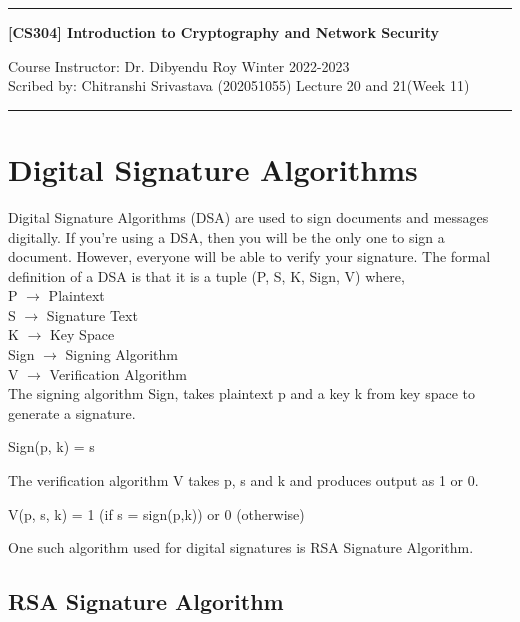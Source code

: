 \documentclass[11pt]{article}
\begin{document}
\noindent
\rule{\textwidth}{1pt}
\begin{center}
{\bf [CS304] Introduction to Cryptography and Network Security}
\end{center}
Course Instructor: Dr. Dibyendu Roy \hfill Winter 2022-2023\\
Scribed by: Chitranshi Srivastava (202051055) \hfill Lecture 20 and 21(Week 11)
\\
\rule{\textwidth}{1pt}

\section{Digital Signature Algorithms}
Digital Signature Algorithms (DSA) are used to sign documents and messages digitally. If you're using a DSA, then you will be the only one to sign a document. However, everyone will be able to verify your signature. The formal definition of a DSA is that it is a tuple (P, S, K, Sign, V) where, \\
    P $\rightarrow$ Plaintext\\
    S $\rightarrow$ Signature Text\\
    K $\rightarrow$ Key Space\\
    Sign $\rightarrow$ Signing Algorithm\\
    V $\rightarrow$ Verification Algorithm\\
The signing algorithm Sign, takes plaintext p and a key k from key space to generate a signature.
\begin{center}
    Sign(p, k) = s
\end{center}
The verification algorithm V takes p, s and k and produces output as 1 or 0.
\begin{center}
    V(p, s, k) = 1 (if s = sign(p,k)) or 0 (otherwise)
\end{center}
One such algorithm used for digital signatures is RSA Signature Algorithm.

\subsection{RSA Signature Algorithm}
\end{document}
